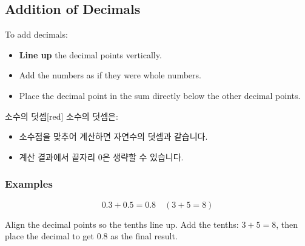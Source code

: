 \documentclass[12pt]{book}
\begin{document}





\twosidedpaper
\subsection{Addition of Decimals}

To add decimals:
\begin{itemize}
  \item \textbf{Line up} the decimal points vertically.  
  \item Add the numbers as if they were whole numbers.  
  \item Place the decimal point in the sum directly below the other decimal points.  
\end{itemize}

\begin{flexbox}{소수의 덧셈}[red]
소수의 덧셈은:  
\begin{itemize}
  \item 소수점을 맞추어 계산하면 자연수의 덧셈과 같습니다.  
  \item 계산 결과에서 끝자리 0은 생략할 수 있습니다.  
\end{itemize}
\end{flexbox}

\subsubsection*{Examples}

\[
0.3 + 0.5 = 0.8 \quad (3 + 5 = 8)
\]

Align the decimal points so the tenths line up.  
Add the tenths: $3+5=8$, then place the decimal to get $0.8$ as the final result.
\end{document}
